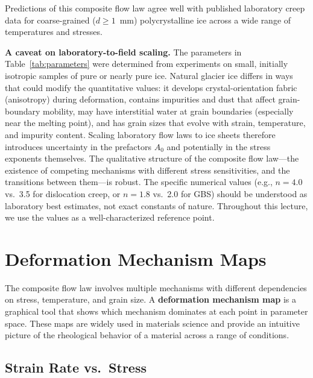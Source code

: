 \documentclass[11pt]{article}
\begin{document}
\noindent Predictions of this composite flow law agree well with published laboratory creep data for coarse-grained ($d \geq 1$~mm) polycrystalline ice across a wide range of temperatures and stresses.

\medskip
\noindent\textbf{A caveat on laboratory-to-field scaling.}  The parameters in Table~\ref{tab:parameters} were determined from experiments on small, initially isotropic samples of pure or nearly pure ice.  Natural glacier ice differs in ways that could modify the quantitative values: it develops crystal-orientation fabric (anisotropy) during deformation, contains impurities and dust that affect grain-boundary mobility, may have interstitial water at grain boundaries (especially near the melting point), and has grain sizes that evolve with strain, temperature, and impurity content.  Scaling laboratory flow laws to ice sheets therefore introduces uncertainty in the prefactors $A_0$ and potentially in the stress exponents themselves.  The qualitative structure of the composite flow law---the existence of competing mechanisms with different stress sensitivities, and the transitions between them---is robust.  The specific numerical values (e.g., $n = 4.0$ vs.\ 3.5 for dislocation creep, or $n = 1.8$ vs.\ 2.0 for GBS) should be understood as laboratory best estimates, not exact constants of nature.  Throughout this lecture, we use the \cite{GoldsbyKohlstedt2001} values as a well-characterized reference point.

\section{Deformation Mechanism Maps}
\label{sec:mechanism_maps}

The composite flow law involves multiple mechanisms with different dependencies on stress, temperature, and grain size.  A \textbf{deformation mechanism map} is a graphical tool that shows which mechanism dominates at each point in parameter space.  These maps are widely used in materials science and provide an intuitive picture of the rheological behavior of a material across a range of conditions.

\subsection{Strain Rate vs.\ Stress}
\end{document}
